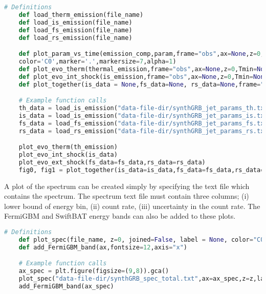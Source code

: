 \documentclass[linenumbers]{aastex631}
\begin{document}
\begin{lstlisting}[language = Python, caption = Plotting Instantaneous Jet Dynamics Parameters, label={lst: plot jet dynamics}]
    # Definitions
    def load_therm_emission(file_name)
    def load_is_emission(file_name)
    def load_fs_emission(file_name)
    def load_rs_emission(file_name)

    def plot_param_vs_time(emission_comp,param,frame="obs",ax=None,z=0, y_factor=1, label=None, Tmin=None, Tmax=None,save_pref=None,fontsize=14,fontweight='bold',disp_xax=True,disp_yax=True,
    color='C0',marker='.',markersize=7,alpha=1)
    def plot_evo_therm(thermal_emission,frame="obs",ax=None,z=0,Tmin=None, Tmax=None,save_pref=None,fontsize=14,fontweight='bold')
    def plot_evo_int_shock(is_emission,frame="obs",ax=None,z=0,Tmin=None, Tmax=None,save_pref=None,fontsize=14,fontweight='bold')
    def plot_together(is_data = None,fs_data=None, rs_data=None,frame="obs", z=0, Tmin=None, Tmax=None,save_pref=None,fontsize=14,fontweight='bold',markregime=True,markersize=10)

    # Example function calls
    th_data = load_is_emission("data-file-dir/synthGRB_jet_params_th.txt")
    is_data = load_is_emission("data-file-dir/synthGRB_jet_params_is.txt")
    fs_data = load_fs_emission("data-file-dir/synthGRB_jet_params_fs.txt")
    rs_data = load_rs_emission("data-file-dir/synthGRB_jet_params_rs.txt")

    plot_evo_therm(th_emission)
    plot_evo_int_shock(is_data)
    plot_evo_ext_shock(fs_data=fs_data,rs_data=rs_data)
    fig0, fig1 = plot_together(is_data=is_data,fs_data=fs_data,rs_data=rs_data)
\end{lstlisting}

A plot of the spectrum can be created simply by specifying the text file which contains the spectrum. The spectrum text file must contain three columns; (i) lower bound of energy bin, (ii) count rate, (iii) uncertainty in the count rate. The FermiGBM and SwiftBAT energy bands can also be added to these plots.

\begin{lstlisting}[language = Python, caption = Plotting Spectra, label={lst: plot spectra}]
    # Definitions
    def plot_spec(file_name, z=0, joined=False, label = None, color="C0", ax=None, nuFnu=True, unc=False, Emin=None, Emax=None, save_pref=None,fontsize=14,fontweight='bold')
    def add_FermiGBM_band(ax,fontsize=12,axis="x")

    # Example function calls
    ax_spec = plt.figure(figsize=(9,8)).gca()
    plot_spec("data-file-dir/synthGRB_spec_total.txt",ax=ax_spec,z=z,label="Total",color="k")
    add_FermiGBM_band(ax_spec)
\end{lstlisting}
\end{document}
